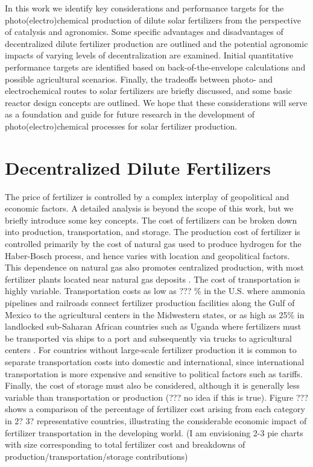 In this work we identify key considerations and performance targets for the photo(electro)chemical production of dilute solar fertilizers from the perspective of catalysis and agronomics. Some specific advantages and disadvantages of decentralized dilute fertilizer production are outlined and the potential agronomic impacts of varying levels of decentralization are examined. Initial quantitative performance targets are identified based on back-of-the-envelope calculations and possible agricultural scenarios. Finally, the tradeoffs between photo- and electrochemical routes to solar fertilizers are briefly discussed, and some basic reactor design concepts are outlined. We hope that these considerations will serve as a foundation and guide for future research in the development of photo(electro)chemical processes for solar fertilizer production.

\section{Decentralized Dilute Fertilizers}

The price of fertilizer is controlled by a complex interplay of geopolitical and economic factors. A detailed analysis is beyond the scope of this work, but we briefly introduce some key concepts. The cost of fertilizers can be broken down into production, transportation, and storage. The production cost of fertilizer is controlled primarily by the cost of natural gas used to produce hydrogen for the Haber-Bosch process, and hence varies with location and geopolitical factors. This dependence on natural gas also promotes centralized production, with most fertilizer plants located near natural gas deposits \cite{McArthur_2017}. The cost of transportation is highly variable. Transportation costs as low as ??? \% in the U.S. where ammonia pipelines and railroads connect fertilizer production facilities along the Gulf of Mexico to the agricultural centers in the Midwestern states, or as high as 25\% in landlocked sub-Saharan African countries such as Uganda where fertilizers must be transported via ships to a port and subsequently via trucks to agricultural centers \cite{}. For countries without large-scale fertilizer production it is common to separate transportation costs into domestic and international, since international transportation is more expensive and sensitive to political factors such as tariffs. Finally, the cost of storage must also be considered, although it is generally less variable than transportation or production (??? no idea if this is true). Figure ??? shows a comparison of the percentage of fertilizer cost arising from each category in 2? 3? representative countries, illustrating the considerable economic impact of fertilizer transportation in the developing world. (I am envisioning 2-3 pie charts with size corresponding to total fertilizer cost and breakdowns of production/transportation/storage contributions)

